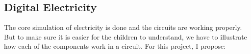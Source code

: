 \documentclass[preprint,12pt]{elsarticle}
\begin{document}







\subsection{Digital Electricity}

The core simulation of electricity is done and the circuits are working properly. But to make sure it is easier for the children to understand, we have to illustrate how each of the components work in a circuit. For this project, I propose:
\end{document}

